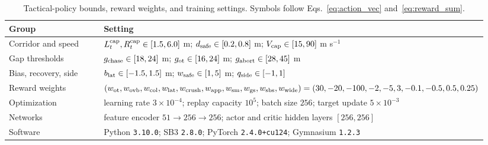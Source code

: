 \begin{table}[t]
\centering
\scriptsize
\caption{Tactical-policy bounds, reward weights, and training settings.
Symbols follow Eqs.~\eqref{eq:action_vec} and~\eqref{eq:reward_sum}.}
\label{tab:tactical_settings}
\renewcommand{\arraystretch}{1.08}
\begin{tabular}{@{}p{0.29\linewidth}p{0.65\linewidth}@{}}
\toprule
Group & Setting \\
\midrule
Corridor and speed & $L_t^{\rm cap},R_t^{\rm cap}\in[1.5,6.0]$ m;
$d_{\rm safe}\in[0.2,0.8]$ m; $V_{\rm cap}\in[15,90]$ m s$^{-1}$ \\
Gap thresholds & $g_{\rm chase}\in[18,24]$ m;
$g_{\rm ot}\in[16,24]$ m; $g_{\rm abort}\in[28,45]$ m \\
Bias, recovery, side & $b_{\rm lat}\in[-1.5,1.5]$ m;
$w_{\rm safe}\in[1,5]$ m; $q_{\rm side}\in[-1,1]$ \\
Reward weights & $(w_{\rm ot},w_{\rm ovb},w_{\rm col},w_{\rm lat},
w_{\rm crush},w_{\rm app},w_{\rm sm},w_{\rm gs},w_{\rm sbs},w_{\rm wide})
=(30,-20,-100,-2,-5,3,-0.1,-0.5,0.5,0.25)$ \\
Optimization & learning rate $3\times10^{-4}$; replay capacity $10^5$;
batch size $256$; target update $5\times10^{-3}$ \\
Networks & feature encoder $51\!\to\!256\!\to\!256$; actor and critic
hidden layers $[256,256]$ \\
Software & Python \texttt{3.10.0}; SB3 \texttt{2.8.0}; PyTorch
\texttt{2.4.0+cu124}; Gymnasium \texttt{1.2.3} \\
\bottomrule
\end{tabular}
\end{table}
